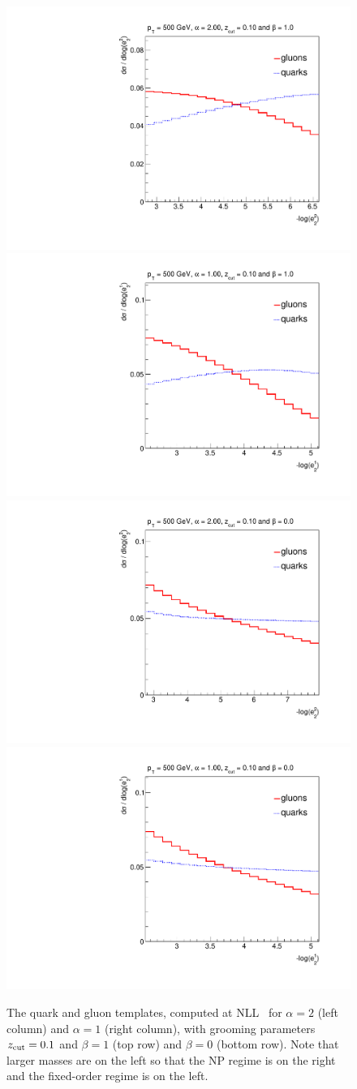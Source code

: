 \begin{figure}[t]
\begin{center}
\includegraphics[width = 0.49\columnwidth]{figures/PDFs_alpha_20zcut1_beta_1023451324.pdf}\includegraphics[width = 0.49\columnwidth]{figures/PDFs_alpha_10zcut1_beta_1023451324.pdf}\\
\includegraphics[width = 0.49\columnwidth]{figures/PDFs_alpha_20zcut1_beta_023451324.pdf}\includegraphics[width = 0.49\columnwidth]{figures/PDFs_alpha_10zcut1_beta_023451324.pdf}
\end{center}


\caption{The quark and gluon templates, computed at NLL~\cite{Marzani:2017mva,Marzani:2017kqd} for $\alpha=2$ (left column) and 
  $\alpha=1$ (right column), with grooming parameters $z_{\rm cut} = 0.1$ and $\beta = 1$ (top row) and $\beta = 0$ (bottom row).  Note that larger masses are on the left so that the NP regime is on the
  right and the fixed-order regime is on the left.}
\label{fig:templates}
\end{figure}

